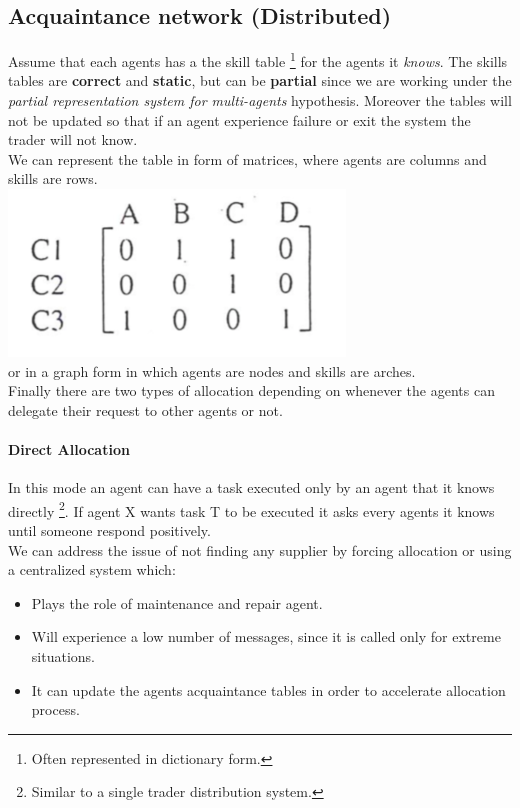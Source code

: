 \documentclass[10pt,a4paper]{article}
\begin{document}
\subsection{Acquaintance network (Distributed)}
Assume that each agents has a the skill table \footnote{Often represented in dictionary form.} for the agents it \textit{knows}. The skills tables are \textbf{correct} and \textbf{static}, but can be \textbf{partial} since we are working under the \textit{partial representation system for multi-agents} hypothesis. Moreover the tables will not be updated so that if an agent experience failure or exit the system the trader will not know.\\
We can represent the table in form of matrices, where agents are columns and skills are rows.\\
\includegraphics[scale=1]{images/acquiantace_table.png}\\
or in a graph form in which agents are nodes and skills are arches.\\
Finally there are two types of allocation depending on whenever the agents can delegate their request to other agents or not.

\paragraph{Direct Allocation}
In this mode an agent can have a task executed only by an agent that it knows directly \footnote{Similar to a single trader distribution system.}. If agent X wants task T to be executed it asks every agents it knows until someone respond positively.\\
We can address the issue of not finding any supplier by forcing allocation or using a centralized system which:
\begin{itemize}
\item Plays the role of maintenance and repair agent.

\item Will experience a low number of messages, since it is called only for extreme situations.
\item It can update the agents acquaintance tables in order to accelerate allocation process.
\end{itemize}
\end{document}
